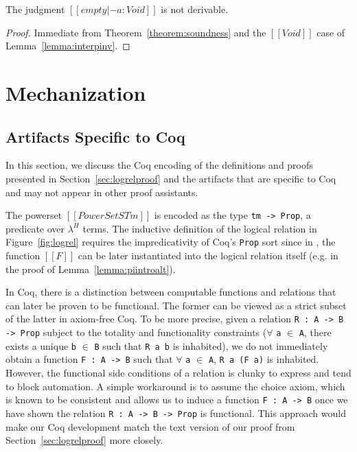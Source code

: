 \documentclass[acmsmall]{acmart}
\newcommand{\lang}{$\lambda^H$\xspace}
\begin{document}
\begin{corollary}
  \label{corollary:consistency}
  The judgment $[[empty |- a : Void ]]$ is not derivable.
\end{corollary}
\begin{proof}
  Immediate from Theorem~\ref{theorem:soundness} and the $[[Void]]$ case of Lemma~\ref{lemma:interpinv}.
\end{proof}

\section{Mechanization}
\label{sec:logrelmech}

\subsection{Artifacts Specific to Coq}
In this section, we discuss the Coq encoding of the definitions and proofs presented
in Section~\ref{sec:logrelproof}  and the artifacts that are
specific to Coq and may not appear in other proof assistants.

The powerset $[[PowerSet STm]]$ is encoded as the type \texttt{tm ->
Prop}, a predicate over \lang{} terms.
The inductive
definition of the logical relation in Figure~\ref{fig:logrel} requires
the impredicativity of Coq's \texttt{Prop} sort since in ,
the function $[[F]]$ can be later instantiated into the logical
relation itself (e.g. in the proof of Lemma~\ref{lemma:piintroalt}).

In Coq, there is a distinction between computable functions and
relations that can later be proven to be functional. The former can be
viewed as a strict subset of the latter in axiom-free Coq. To be more
precise, given a relation \texttt{R : A -> B -> Prop} subject to the
totality and functionality constraints ($\forall$ \texttt{a} $\in$
\texttt{A}, there exists a unique \texttt{b} $\in$ \texttt{B} such
that \texttt{R a b} is inhabited), we do not immediately obtain a function
\texttt{F : A -> B} such that $\forall$ \texttt{a} $\in$ \texttt{A},
\texttt{R a (F a)} is inhabited. However, the functional side
conditions of a relation is clunky to express and tend to block
automation. A simple workaround is to assume the choice axiom, which
is known to be consistent and allows us to induce a function \texttt{F
: A -> B} once we have shown the relation \texttt{R : A -> B -> Prop}
is functional. This approach would make our Coq development match
the text version of our proof from Section~\ref{sec:logrelproof} more
closely.
\end{document}

